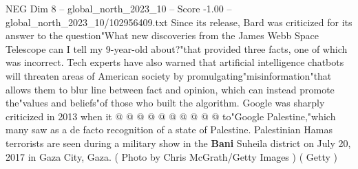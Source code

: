 \begin{textsample}{NEG Dim 8 – global\_north\_2023\_10 – Score -1.00 – global\_north\_2023\_10/102956409.txt}
Since its release, Bard was criticized for its answer to the question"What new discoveries from the James Webb Space Telescope can I tell my 9-year-old about?"that provided three facts, one of which was incorrect.
Tech experts have also warned that artificial intelligence chatbots will threaten areas of American society by promulgating"misinformation"that allows them to blur line between fact and opinion, which can instead promote the"values and beliefs"of those who built the algorithm.
Google was sharply criticized in 2013 when it @ @ @ @ @ @ @ @ @ @ to"Google Palestine,"which many saw as a de facto recognition of a state of Palestine.
Palestinian Hamas terrorists are seen during a military show in the \textbf{Bani} Suheila district on July 20, 2017 in Gaza City, Gaza. ( Photo by Chris McGrath/Getty Images ) ( Getty )

\end{textsample}
